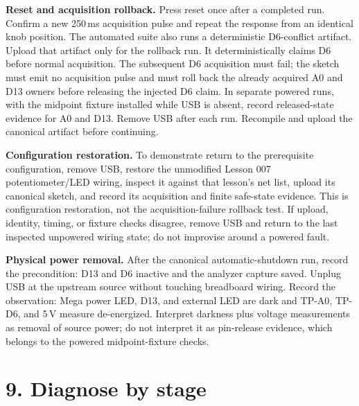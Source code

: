 \documentclass[11pt]{article}
\begin{document}
\textbf{Reset and acquisition rollback.} Press reset once after a completed
run. Confirm a new 250\,ms acquisition pulse and repeat the response from an
identical knob position. The automated suite also runs a deterministic
D6-conflict artifact.
Upload that artifact only for the rollback run. It deterministically claims D6
before normal acquisition. The subsequent D6 acquisition must fail; the sketch
must emit no acquisition pulse and must roll back the already acquired A0 and
D13 owners before releasing the injected D6 claim. In separate powered runs,
with the midpoint fixture installed while USB is absent, record released-state
evidence for A0 and D13. Remove USB after each run. Recompile and upload the
canonical artifact before continuing.

\textbf{Configuration restoration.} To demonstrate return to the prerequisite
configuration, remove USB, restore the unmodified Lesson 007
potentiometer/LED wiring, inspect it against that lesson's net list, upload its
canonical sketch, and record its acquisition and finite safe-state evidence.
This is configuration restoration, not the acquisition-failure rollback test.
If upload, identity, timing, or fixture checks disagree, remove USB and return
to the last inspected unpowered wiring state; do not improvise around a powered
fault.

\textbf{Physical power removal.} After the canonical automatic-shutdown run,
record the precondition: D13 and D6 inactive and the analyzer capture saved.
Unplug USB at the upstream source without touching breadboard wiring. Record
the observation: Mega power LED, D13, and external LED are dark and TP-A0,
TP-D6, and 5\,V measure de-energized. Interpret darkness plus voltage
measurements as removal of source power; do not interpret it as pin-release
evidence, which belongs to the powered midpoint-fixture checks.

\section*{9. Diagnose by stage}
\end{document}
